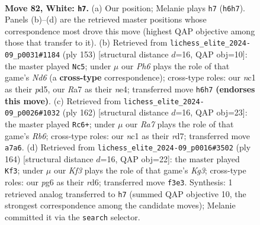 \documentclass[11pt]{article}
\begin{document}
\clearpage

\begin{figure}[p]\centering
\begin{subfigure}{0.46\textwidth}\centering
\resizebox{\linewidth}{!}{%
\newchessgame
\chessboard[
  setfen={8/R7/4k1pP/5p2/5P2/5K2/p7/2n5 w - - 6 82},
  showmover=false,
  pgfstyle=straightmove, color=movearrow, markmove={h6-h7}
]}
\caption{}
\end{subfigure}\hfill
\begin{subfigure}{0.46\textwidth}\centering
\resizebox{\linewidth}{!}{%
\newchessgame
\chessboard[
  setfen={8/4k3/1p3p2/1p1P1P2/4N1K1/2Pn4/8/8 b - - 0 77},
  showmover=false,
  pgfstyle=straightmove, color=movearrow, markmove={d3-c5}
]}
\caption{}
\end{subfigure}
\\[4pt]
\begin{subfigure}{0.46\textwidth}\centering
\resizebox{\linewidth}{!}{%
\newchessgame
\chessboard[
  setfen={8/3r4/1R4p1/6P1/4P3/2k1K3/2p5/8 w - - 8 82},
  showmover=false,
  pgfstyle=straightmove, color=movearrow, markmove={b6-c6}
]}
\caption{}
\end{subfigure}\hfill
\begin{subfigure}{0.46\textwidth}\centering
\resizebox{\linewidth}{!}{%
\newchessgame
\chessboard[
  setfen={8/6k1/3r2p1/2R4p/5P2/6K1/8/8 w - - 10 83},
  showmover=false,
  pgfstyle=straightmove, color=movearrow, markmove={g3-f3}
]}
\caption{}
\end{subfigure}
\caption{\textbf{Move 82, White: \texttt{h7}.} (a) Our position; Melanie plays \texttt{h7} (\texttt{h6h7}). Panels (b)--(d) are the retrieved master positions whose correspondence most drove this move (highest QAP objective among those that transfer to it). (b) Retrieved from \texttt{lichess\_elite\_2024-09\_p0031\#1184} (ply 153) [structural distance $d$=16, QAP obj=10]: the master played \texttt{Nc5}; under $\mu$ our \emph{Ph6} plays the role of that game's \emph{Nd6} (a \textbf{cross-type} correspondence); cross-type roles: our \emph{n}c1 as their \emph{p}d5, our \emph{R}a7 as their \emph{n}e4; transferred move \texttt{h6h7} \textbf{(endorses this move)}. (c) Retrieved from \texttt{lichess\_elite\_2024-09\_p0026\#1032} (ply 162) [structural distance $d$=16, QAP obj=23]: the master played \texttt{Rc6+}; under $\mu$ our \emph{Ra7} plays the role of that game's \emph{Rb6}; cross-type roles: our \emph{n}c1 as their \emph{r}d7; transferred move \texttt{a7a6}. (d) Retrieved from \texttt{lichess\_elite\_2024-09\_p0016\#3502} (ply 164) [structural distance $d$=16, QAP obj=22]: the master played \texttt{Kf3}; under $\mu$ our \emph{Kf3} plays the role of that game's \emph{Kg3}; cross-type roles: our \emph{p}g6 as their \emph{r}d6; transferred move \texttt{f3e3}. Synthesis: 1 retrieved analog transferred to \texttt{h7} (summed QAP objective 10, the strongest correspondence among the candidate moves); Melanie committed it via the \texttt{search} selector.}
\label{fig:thought-m162}
\end{figure}
\end{document}
